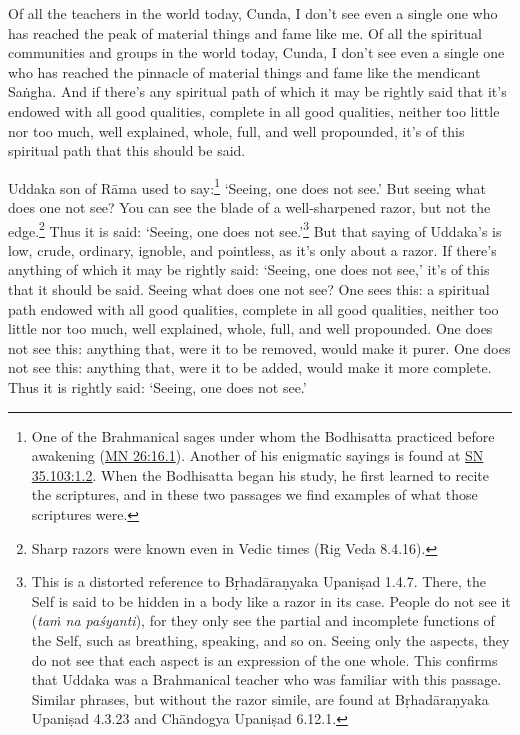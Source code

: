 \documentclass[12pt,openany]{book}%
\begin{document}
Of all the teachers in the world today, Cunda, I don’t see even a single one who has reached the peak of material things and fame like me. Of all the spiritual communities and groups in the world today, Cunda, I don’t see even a single one who has reached the pinnacle of material things and fame like the mendicant \textsanskrit{Saṅgha}. And if there’s any spiritual path of which it may be rightly said that it’s endowed with all good qualities, complete in all good qualities, neither too little nor too much, well explained, whole, full, and well propounded, it’s of this spiritual path that this should be said. 

Uddaka son of \textsanskrit{Rāma} used to say:\footnote{One of the Brahmanical sages under whom the Bodhisatta practiced before awakening (\href{https://suttacentral.net/mn26/en/sujato\#16.1}{MN 26:16.1}). Another of his enigmatic sayings is found at \href{https://suttacentral.net/sn35.103/en/sujato\#1.2}{SN 35.103:1.2}. When the Bodhisatta began his study, he first learned to recite the scriptures, and in these two passages we find examples of what those scriptures were. } ‘Seeing, one does not see.’ But seeing what does one not see? You can see the blade of a well-sharpened razor, but not the edge.\footnote{Sharp razors were known even in Vedic times (Rig Veda 8.4.16). } Thus it is said: ‘Seeing, one does not see.’\footnote{This is a distorted reference to \textsanskrit{Bṛhadāraṇyaka} \textsanskrit{Upaniṣad} 1.4.7. There, the Self is said to be hidden in a body like a razor in its case. People do not see it (\textit{\textsanskrit{taṁ} na \textsanskrit{paśyanti}}), for they only see the partial and incomplete functions of the Self, such as breathing, speaking, and so on. Seeing only the aspects, they do not see that each aspect is an expression of the one whole. This confirms that Uddaka was a Brahmanical teacher who was familiar with this passage. Similar phrases, but without the razor simile, are found at \textsanskrit{Bṛhadāraṇyaka} \textsanskrit{Upaniṣad} 4.3.23 and \textsanskrit{Chāndogya} \textsanskrit{Upaniṣad} 6.12.1. } But that saying of Uddaka’s is low, crude, ordinary, ignoble, and pointless, as it’s only about a razor. If there’s anything of which it may be rightly said: ‘Seeing, one does not see,’ it’s of this that it should be said. Seeing what does one not see? One sees this: a spiritual path endowed with all good qualities, complete in all good qualities, neither too little nor too much, well explained, whole, full, and well propounded. One does not see this: anything that, were it to be removed, would make it purer. One does not see this: anything that, were it to be added, would make it more complete. Thus it is rightly said: ‘Seeing, one does not see.’ 
\end{document}
